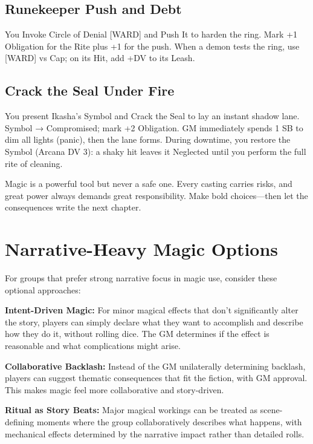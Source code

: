\documentclass[11pt,twoside,openany]{book}
\begin{document}
\subsection*{Runekeeper Push and Debt}

You Invoke Circle of Denial [WARD] and Push It to harden the ring. Mark +1 Obligation for the Rite plus +1 for the push. When a demon tests the ring, use [WARD] vs Cap; on its Hit, add +DV to its Leash.

\subsection*{Crack the Seal Under Fire}

You present Ikasha's Symbol and Crack the Seal to lay an instant shadow lane. Symbol → Compromised; mark +2 Obligation. GM immediately spends 1 SB to dim all lights (panic), then the lane forms. During downtime, you restore the Symbol (Arcana DV 3): a shaky hit leaves it Neglected until you perform the full rite of cleaning.

\begin{tcolorbox}[colback=gray!5!white, colframe=gray!75!black, title=Closing Thought, fonttitle=\bfseries]
Magic is a powerful tool but never a safe one. Every casting carries risks, and great power always demands great responsibility. Make bold choices—then let the consequences write the next chapter.
\end{tcolorbox}

\section*{Narrative-Heavy Magic Options} 

For groups that prefer strong narrative focus in magic use, consider these optional approaches:

\textbf{Intent-Driven Magic:} For minor magical effects that don't significantly alter the story, players can simply declare what they want to accomplish and describe how they do it, without rolling dice. The GM determines if the effect is reasonable and what complications might arise.

\textbf{Collaborative Backlash:} Instead of the GM unilaterally determining backlash, players can suggest thematic consequences that fit the fiction, with GM approval. This makes magic feel more collaborative and story-driven.

\textbf{Ritual as Story Beats:} Major magical workings can be treated as scene-defining moments where the group collaboratively describes what happens, with mechanical effects determined by the narrative impact rather than detailed rolls.
\end{document}
